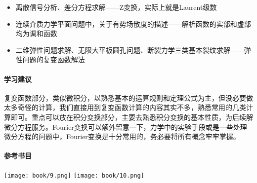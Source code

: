 \begin{itemize}
    \item 离散信号分析、差分方程求解——Z变换，实际上就是Laurent级数

    \item 连续介质力学平面问题中，关于有势场散度的描述——解析函数的实部和虚部均为调和函数

    \item 二维弹性问题求解、无限大平板圆孔问题、断裂力学三类基本裂纹求解——弹性问题的复变函数解法
\end{itemize}

\paragraph{学习建议}

复变函数部分，类似微积分，以熟悉基本的运算规则和定理公式为主，但没必要做太多奇怪的计算，我们直接用到复变函数计算的内容其实不多，熟悉常用的几类计算即可。重点可以放在积分变换部分，主要去熟悉积分变换的基本性质，为后续解微分方程服务。Fourier变换可以额外留意一下，力学中的实验手段或是一些处理微分方程的问题中，Fourier变换是十分常用的，务必要将所有概念牢牢掌握。

\paragraph{参考书目}

\begin{center}
    \texttt{[image: book/9.png]} \quad
    \texttt{[image: book/10.png]}
\end{center}


